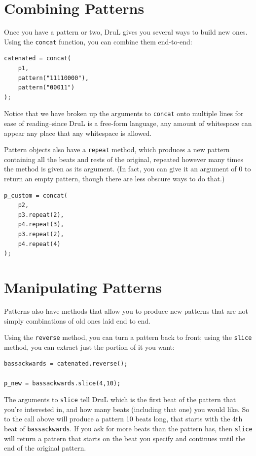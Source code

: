 \section{Combining Patterns}

Once you have a pattern or two, DruL gives you several ways to build new ones.  Using the {\tt concat} function, you can combine them end-to-end:
\begin{lstlisting}
catenated = concat(
	p1,
	pattern("11110000"),
	pattern("00011")
);
\end{lstlisting}
Notice that we have broken up the arguments to {\tt concat} onto multiple lines for ease of reading--since DruL is a free-form language, any amount of whitespace can appear any place that any whitespace is allowed.

Pattern objects also have a {\tt repeat} method, which produces a new pattern containing all the beats and rests of the original, repeated however many times the method is given as its argument.  (In fact, you can give it an argument of 0 to return an empty pattern, though there are less obscure ways to do that.)

\begin{lstlisting}
p_custom = concat(
	p2,
	p3.repeat(2),
	p4.repeat(3),
	p3.repeat(2),
	p4.repeat(4)
);
\end{lstlisting}
\section{Manipulating Patterns}

Patterns also have methods that allow you to produce new patterns that are not simply combinations of old ones laid end to end.

Using the {\tt reverse} method, you can turn a pattern back to front; using the {\tt slice} method, you can extract just the portion of it you want:

\begin{lstlisting}
bassackwards = catenated.reverse();

p_new = bassackwards.slice(4,10);
\end{lstlisting}

The arguments to {\tt slice} tell DruL which is the first beat of the pattern that you're interested in, and how many beats (including that one) you would like.  So to the call above will produce a pattern 10 beats long, that starts with the 4th beat of {\tt bassackwards}.  If you ask for more beats than the pattern has, then {\tt slice} will return a pattern that starts on the beat you specify and continues until the end of the original pattern.

